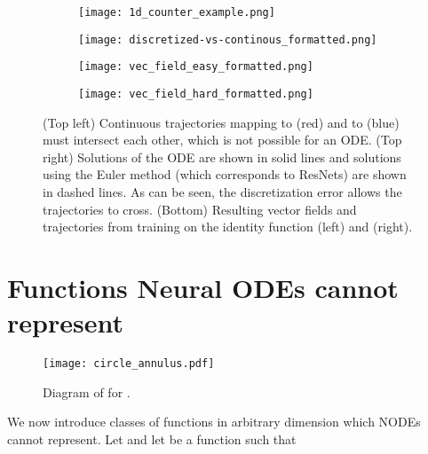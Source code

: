 \documentclass{article}
\begin{document}
\begin{figure}[t]
\centering
\begin{subfigure}[t]{0.37\linewidth}
\centering
\texttt{[image: 1d\_counter\_example.png]}
\end{subfigure}\hspace{0.05\linewidth}
\begin{subfigure}[t]{0.37\linewidth}
\centering
\texttt{[image: discretized-vs-continous\_formatted.png]}
\end{subfigure}
\begin{subfigure}[t]{0.37\linewidth}
\centering
\texttt{[image: vec\_field\_easy\_formatted.png]}
\end{subfigure}\hspace{0.05\linewidth}
\begin{subfigure}[t]{0.37\linewidth}
\centering
\texttt{[image: vec\_field\_hard\_formatted.png]}
\end{subfigure}
\setlength{\belowcaptionskip}{-10pt}
\caption{(Top left) Continuous trajectories mapping  to  (red) and  to  (blue) must intersect each other, which is not possible for an ODE. (Top right) Solutions of the ODE are shown in solid lines and solutions using the Euler method (which corresponds to ResNets) are shown in dashed lines. As can be seen, the discretization error allows the trajectories to cross. (Bottom) Resulting vector fields and trajectories from training on the identity function (left) and  (right).}
\label{1d-experiments}

\end{figure}

\section{Functions Neural ODEs cannot represent}
\begin{wrapfigure}{r}{0.2\linewidth}
  \vspace{-25pt}
  \begin{center}
    \texttt{[image: circle\_annulus.pdf]}
  \end{center}
  \caption{Diagram of  for .}
  \label{g-in-2d}
  \vskip -1cm
\end{wrapfigure}
We now introduce classes of functions in arbitrary dimension  which NODEs cannot represent. Let  and let  be a function such that
\end{document}
